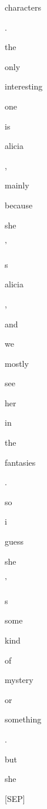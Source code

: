 \documentclass[varwidth=150mm]{standalone}
\begin{document}
\begin{CJK*}{UTF8}{gbsn}
{{{\colorbox{red!4.1420464515686035}{\strut characters} \colorbox{red!0.0}{\strut .} \colorbox{red!9.867327690124512}{\strut the} \colorbox{red!0.0}{\strut only} \colorbox{red!2.058037757873535}{\strut interesting} \colorbox{red!7.4748125076293945}{\strut one} \colorbox{red!7.8743672370910645}{\strut is} \colorbox{red!54.12678146362305}{\strut alicia} \colorbox{red!1.882375955581665}{\strut ,} \colorbox{red!4.229515075683594}{\strut mainly} \colorbox{red!2.336461305618286}{\strut because} \colorbox{red!3.2435641288757324}{\strut she} \colorbox{red!0.0}{\strut '} \colorbox{red!1.4542663097381592}{\strut s} \colorbox{red!42.933292388916016}{\strut alicia} \colorbox{red!0.0}{\strut ,} \colorbox{red!7.436645030975342}{\strut and} \colorbox{red!2.3800461292266846}{\strut we} \colorbox{red!2.6091392040252686}{\strut mostly} \colorbox{red!1.6143115758895874}{\strut see} \colorbox{red!1.341051697731018}{\strut her} \colorbox{red!0.0}{\strut in} \colorbox{red!3.3558146953582764}{\strut the} \colorbox{red!26.271495819091797}{\strut fantasies} \colorbox{red!0.0}{\strut .} \colorbox{red!12.194019317626953}{\strut so} \colorbox{red!23.925695419311523}{\strut i} \colorbox{red!8.045122146606445}{\strut guess} \colorbox{red!5.464011192321777}{\strut she} \colorbox{red!3.5829036235809326}{\strut '} \colorbox{red!3.0447802543640137}{\strut s} \colorbox{red!4.230215549468994}{\strut some} \colorbox{red!1.1146727800369263}{\strut kind} \colorbox{red!0.0}{\strut of} \colorbox{red!2.9173707962036133}{\strut mystery} \colorbox{red!3.9732978343963623}{\strut or} \colorbox{red!2.713561534881592}{\strut something} \colorbox{red!0.0}{\strut .} \colorbox{red!11.702569961547852}{\strut but} \colorbox{red!8.990478515625}{\strut she} \colorbox{red!5.095954418182373}{\strut [SEP]}
}}}
\end{CJK*}
\end{document}
